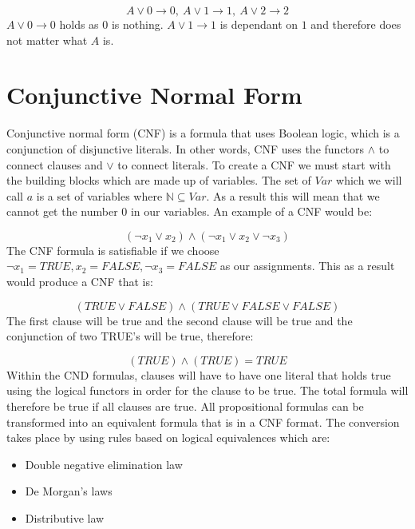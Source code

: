 \documentclass[11pt,a4paper, notitlepage]{report}
\begin{document}
\begin{displaymath}
A \lor 0 \rightarrow 0, \: A \lor 1 \rightarrow 1, \: A \lor 2 \rightarrow 2
\end{displaymath}
$A \lor 0 \rightarrow 0$ holds as $0$ is nothing. $A \lor 1 \rightarrow 1$ is dependant on $1$ and therefore does not matter what $A$ is.

\section{Conjunctive Normal Form}
\label{sec:CNF}

Conjunctive normal form (CNF) is a formula that uses Boolean logic, which is a conjunction of disjunctive literals. In other words, CNF uses the functors $\land$ to connect clauses and $\lor$ to connect literals.
To create a CNF we must start with the building blocks which are made up of variables. The set of $Var$ which we will call $a$ is a set of variables where $\mathbb{N} \subseteq Var$. As a result this will mean that we cannot get the number $0$ in our variables.
An example of a CNF would be:

\begin{displaymath}
(\neg x _1 \lor x _2) \land (\neg x _1 \lor x _2 \lor \neg x _3)
\end{displaymath}
The CNF formula is satisfiable if we choose $\neg x_1 = TRUE, x _2 = FALSE, \neg x_3 = FALSE$ as our assignments. This as a result would produce a CNF that is:

\begin{displaymath}
(TRUE \lor FALSE) \land (TRUE \lor FALSE \lor FALSE)
\end{displaymath}
The first clause will be true and the second clause will be true and the conjunction of two TRUE's will be true, therefore:

\begin{displaymath}
(TRUE) \land (TRUE) = TRUE
\end{displaymath}
Within the CND formulas, clauses will have to have one literal that holds true using the logical functors in order for the clause to be true. The total formula will therefore be true if all clauses are true.
All propositional formulas can be transformed into an equivalent formula that is in a CNF format. The conversion takes place by using rules based on logical equivalences which are:

\begin{itemize}
\item Double negative elimination law
\item De Morgan's laws
\item Distributive law
\end{itemize}
\end{document}
